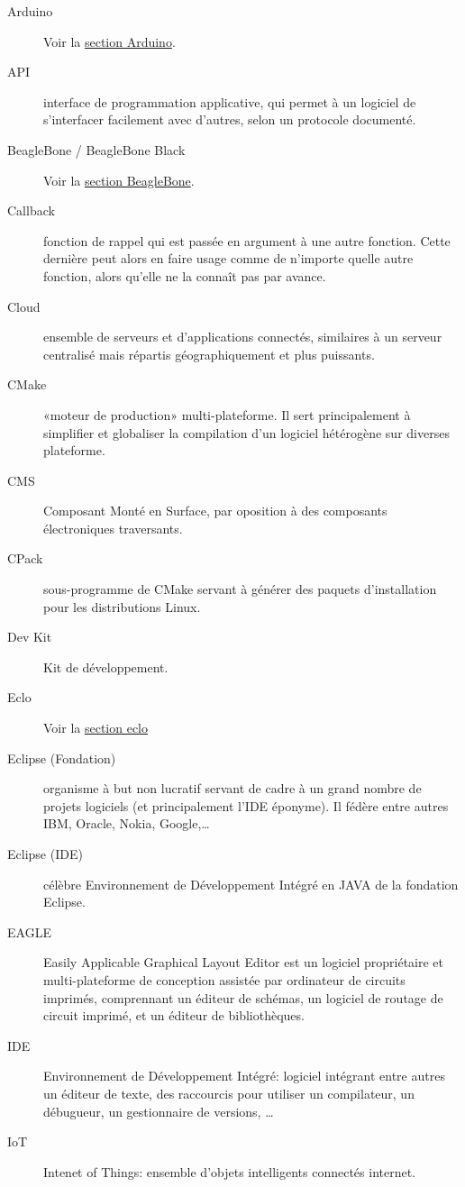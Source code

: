 \documentclass{article}
\begin{document}
\begin{description}
    \item[Arduino] Voir la \hyperref[arduino]{section Arduino}.
    \item[API] interface de programmation applicative, qui permet à un logiciel de s’interfacer facilement avec d’autres, selon un protocole documenté.
    \item[BeagleBone / BeagleBone Black] Voir la \hyperref[bbb]{section BeagleBone}.
    \item[Callback] fonction de rappel qui est passée en argument à une autre fonction. Cette dernière peut alors en faire usage comme de n'importe quelle autre fonction, alors qu'elle ne la connaît pas par avance.
    \item[Cloud] ensemble de serveurs et d’applications connectés, similaires à un serveur centralisé mais répartis géographiquement et plus puissants.
    \item[CMake] «moteur de production» multi-plateforme. Il sert principalement à simplifier et globaliser la compilation d’un logiciel hétérogène sur diverses plateforme.
    \item[CMS] Composant Monté en Surface, par oposition à des composants électroniques traversants.
    \item[CPack] sous-programme de CMake servant à générer des paquets d’installation pour les distributions Linux.
    \item[Dev Kit] Kit de développement.
    \item[Eclo] Voir la \hyperref[eclo]{section eclo}
    \item[Eclipse (Fondation)] organisme à but non lucratif servant de cadre à un grand nombre de projets logiciels (et principalement l’IDE éponyme). Il fédère entre autres IBM, Oracle, Nokia, Google,…
    \item[Eclipse (IDE)] célèbre Environnement de Développement Intégré en JAVA de la fondation Eclipse.
    \item[EAGLE] Easily Applicable Graphical Layout Editor est un logiciel propriétaire et multi-plateforme de conception assistée par ordinateur de circuits imprimés, comprennant un éditeur de schémas, un logiciel de routage de circuit imprimé, et un éditeur de bibliothèques.
    \item[IDE] Environnement de Développement Intégré: logiciel intégrant entre autres un éditeur de texte, des raccourcis pour utiliser un compilateur, un débugueur, un gestionnaire de versions, …
    \item[IoT] Intenet of Things: ensemble d’objets intelligents connectés internet.

\end{description}
\end{document}
